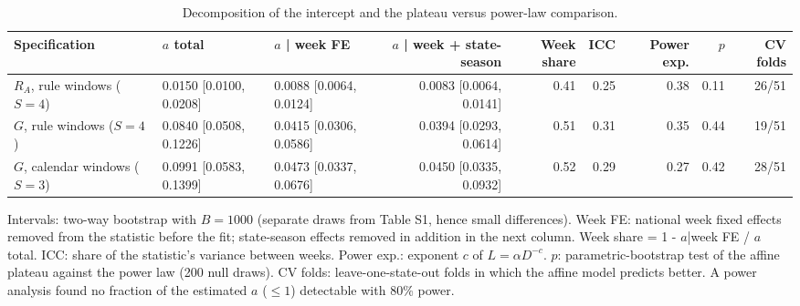 \begin{table}[htbp]
\centering
\footnotesize
\caption{Decomposition of the intercept and the plateau versus power-law comparison.}
\label{tab:s2}
\begin{tabular}{lllrrrrrr}
\toprule
Specification & $a$ total & $a$ | week FE & $a$ | week + state-season & Week share & ICC & Power exp. & $p$ & CV folds \\
\midrule
$R_A$, rule windows ($S=4$) & 0.0150 [0.0100, 0.0208] & 0.0088 [0.0064, 0.0124] & 0.0083 [0.0064, 0.0141] & 0.41 & 0.25 & 0.38 & 0.11 & 26/51 \\
$G$, rule windows ($S=4$) & 0.0840 [0.0508, 0.1226] & 0.0415 [0.0306, 0.0586] & 0.0394 [0.0293, 0.0614] & 0.51 & 0.31 & 0.35 & 0.44 & 19/51 \\
$G$, calendar windows ($S=3$) & 0.0991 [0.0583, 0.1399] & 0.0473 [0.0337, 0.0676] & 0.0450 [0.0335, 0.0932] & 0.52 & 0.29 & 0.27 & 0.42 & 28/51 \\
\bottomrule
\end{tabular}
\par\smallskip
\begin{minipage}{0.95\linewidth}\scriptsize Intervals: two-way bootstrap with $B=1000$ (separate draws from Table S1, hence small differences). Week FE: national week fixed effects removed from the statistic before the fit; state-season effects removed in addition in the next column. Week share = 1 - $a$|week FE / $a$ total. ICC: share of the statistic's variance between weeks. Power exp.: exponent $c$ of $L = \alpha D^{-c}$. $p$: parametric-bootstrap test of the affine plateau against the power law (200 null draws). CV folds: leave-one-state-out folds in which the affine model predicts better. A power analysis found no fraction of the estimated $a$ ($\le 1$) detectable with 80\% power.\end{minipage}
\end{table}
